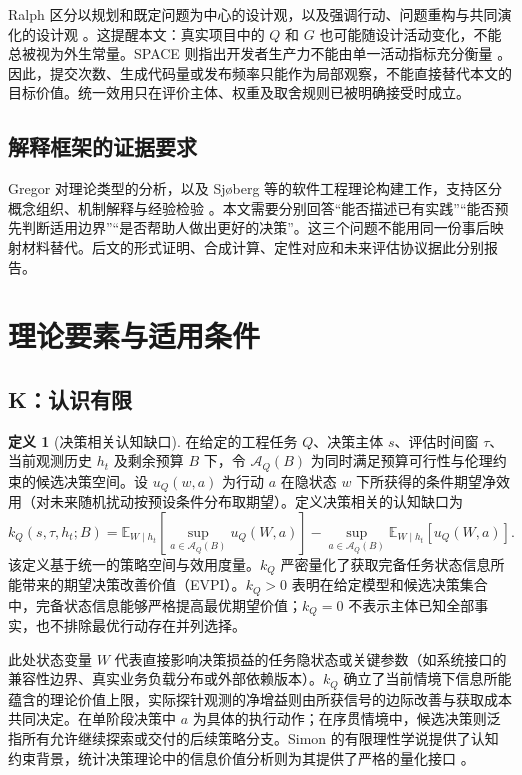 \documentclass[11pt,a4paper]{ctexart}
\numberwithin{equation}{section}
\theoremstyle{definition}
\newtheorem{definition}{定义}[section]
\theoremstyle{plain}
\begin{document}
Ralph 区分以规划和既定问题为中心的设计观，以及强调行动、问题重构与共同演化的设计观 \cite{ralph2013}。这提醒本文：真实项目中的 $Q$ 和 $G$ 也可能随设计活动变化，不能总被视为外生常量。SPACE 则指出开发者生产力不能由单一活动指标充分衡量 \cite{forsgren2021}。因此，提交次数、生成代码量或发布频率只能作为局部观察，不能直接替代本文的目标价值。统一效用只在评价主体、权重及取舍规则已被明确接受时成立。

\subsection{解释框架的证据要求}

Gregor 对理论类型的分析，以及 Sjøberg 等的软件工程理论构建工作，支持区分概念组织、机制解释与经验检验 \cite{gregor2006,sjoberg2008}。本文需要分别回答“能否描述已有实践”“能否预先判断适用边界”“是否帮助人做出更好的决策”。这三个问题不能用同一份事后映射材料替代。后文的形式证明、合成计算、定性对应和未来评估协议据此分别报告。

\section{理论要素与适用条件}

\subsection{K：认识有限}

\begin{definition}[决策相关认知缺口]
在给定的工程任务 $Q$、决策主体 $s$、评估时间窗 $\tau$、当前观测历史 $h_t$ 及剩余预算 $B$ 下，令 $\mathcal A_Q(B)$ 为同时满足预算可行性与伦理约束的候选决策空间。设 $u_Q(w,a)$ 为行动 $a$ 在隐状态 $w$ 下所获得的条件期望净效用（对未来随机扰动按预设条件分布取期望）。定义决策相关的认知缺口为
\begin{equation}
k_Q(s,\tau,h_t;B)=
\mathbb E_{W\mid h_t}\!\left[\sup_{a\in\mathcal A_Q(B)}u_Q(W,a)\right]
-\sup_{a\in\mathcal A_Q(B)}\mathbb E_{W\mid h_t}[u_Q(W,a)].
\label{eq:knowledge-gap}
\end{equation}
该定义基于统一的策略空间与效用度量。$k_Q$ 严密量化了获取完备任务状态信息所能带来的期望决策改善价值（EVPI）。$k_Q>0$ 表明在给定模型和候选决策集合中，完备状态信息能够严格提高最优期望价值；$k_Q=0$ 不表示主体已知全部事实，也不排除最优行动存在并列选择。
\end{definition}

此处状态变量 $W$ 代表直接影响决策损益的任务隐状态或关键参数（如系统接口的兼容性边界、真实业务负载分布或外部依赖版本）。$k_Q$ 确立了当前情境下信息所能蕴含的理论价值上限，实际探针观测的净增益则由所获信号的边际改善与获取成本共同决定。在单阶段决策中 $a$ 为具体的执行动作；在序贯情境中，候选决策则泛指所有允许继续探索或交付的后续策略分支。Simon 的有限理性学说提供了认知约束背景，统计决策理论中的信息价值分析则为其提供了严格的量化接口 \cite{simon1978,howard1966}。
\end{document}
